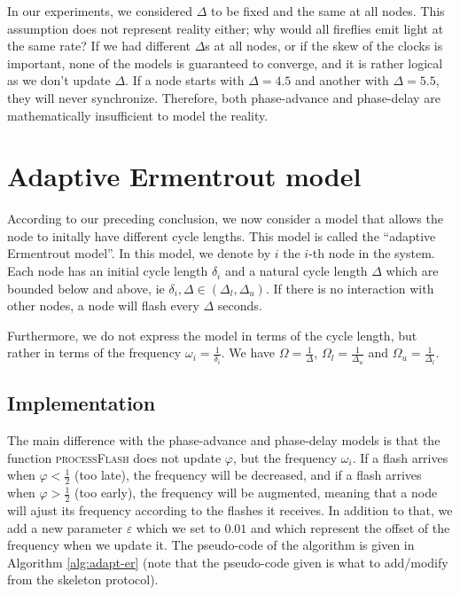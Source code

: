 \documentclass[a4paper, 11pt]{article}
\renewcommand{\epsilon}{\varepsilon}
\renewcommand{\phi}{\varphi}
\theoremstyle{plain}
\theoremstyle{definition}
\begin{document}
     In our experiments, we considered $\Delta$ to be fixed and the same at all nodes. This assumption does
     not represent reality either; why would all fireflies emit light at the same rate? If we had different
     $\Delta$s at all nodes, or if the skew of the clocks is important, none of the models is guaranteed to
     converge, and it is rather logical as we don't update $\Delta$. If a node starts with $\Delta = 4.5$ and
     another with $\Delta = 5.5$, they will never synchronize. Therefore, both phase-advance and phase-delay
     are mathematically insufficient to model the reality.



\section{Adaptive Ermentrout model}
\label{sec:adapt-ermentr-model}

  According to our preceding conclusion, we now consider a model that allows the node to initally have
  different cycle lengths. This model is called the ``adaptive Ermentrout model''. In this model, we denote by
  $i$ the $i$-th node in the system. Each node has an initial cycle length $\delta_i$ and a natural cycle
  length $\Delta$ which are bounded below and above, ie $\delta_i, \Delta \in (\Delta_l, \Delta_u)$. If there
  is no interaction with other nodes, a node will flash every $\Delta$ seconds. 

  Furthermore, we do not express the model in terms of the cycle length, but rather in terms of the frequency
  $\omega_i = \frac{1}{\delta_i}$. We have $\Omega = \frac{1}{\Delta}$, $\Omega_l = \frac{1}{\Delta_u}$ and
  $\Omega_u = \frac{1}{\Delta_l}$.

  \subsection{Implementation}
  \label{sec:implementation-1}

    The main difference with the phase-advance and phase-delay models is that the function
    \textsc{processFlash} does not update $\phi$, but the frequency $\omega_i$. If a flash arrives when $\phi
    < \frac{1}{2}$ (too late), the frequency will be decreased, and if a flash arrives when $\phi >
    \frac{1}{2}$ (too early), the frequency will be augmented, meaning that a node will ajust its frequency
    according to the flashes it receives. In addition to that, we add a new parameter $\epsilon$ which
    we set to $0.01$ and which represent the offset of the frequency when we update it. The pseudo-code of the
    algorithm is given in Algorithm \ref{alg:adapt-er} (note that the pseudo-code given is what to add/modify
    from the skeleton protocol).
\end{document}
